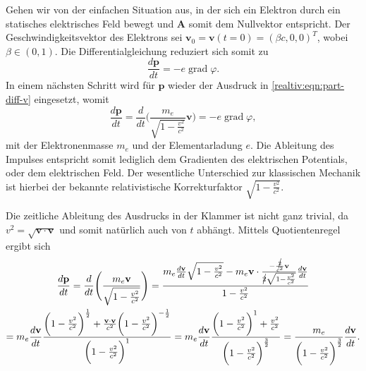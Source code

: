 \begin{beispiel}
\label{realtiv:bsp:teilchen-konst-e-feld}
Gehen wir von der einfachen Situation aus,
in der sich ein Elektron durch ein statisches
elektrisches Feld bewegt und \(\mathbf{A}\)
somit dem Nullvektor entspricht.
Der Geschwindigkeitsvektor des Elektrons sei
\(\mathbf{v}_0 = \mathbf{v}(t=0) =(\beta c, 0, 0)^T\), wobei
\(\beta \in (0, 1)\).
Die Differentialgleichung reduziert sich somit zu
\begin{equation}
    \frac{d\mathbf{p}}{dt} =
    - e \operatorname{grad} \varphi.
    \label{relativ:eqn:euler-lagrange-bsp-1}
\end{equation}
In einem nächsten Schritt wird für \(\mathbf{p}\)
wieder der Ausdruck in \eqref{realtiv:eqn:part-diff-v} eingesetzt,
womit
\begin{equation}
    \frac{d\mathbf{p}}{dt} =
    \frac{d}{dt} \Biggl(\frac{m_e}{\sqrt{1-\frac{v^2}{c^2}}} \mathbf{v}\Biggr) =
    - e \operatorname{grad} \varphi,
\end{equation}
mit der Elektronenmasse \(m_e\) und der Elementarladung \(e\).
Die Ableitung des Impulses entspricht somit lediglich
dem Gradienten des elektrischen Potentials, oder dem elektrischen Feld.
Der wesentliche Unterschied zur klassischen Mechanik ist hierbei
der bekannte relativistische Korrekturfaktor
\(\sqrt{1-\frac{v^2}{c^2}}\).

Die zeitliche Ableitung des Ausdrucks in der Klammer ist nicht ganz trivial,
da \(v^2=\sqrt{\mathbf{v}\cdot\mathbf{v}}\)
und somit natürlich auch von \(t\) abhängt.
Mittels Quotientenregel ergibt sich
\begin{multline*}
    \frac{d\mathbf{p}}{dt}
    = \frac{d}{dt} \Biggl(\frac{m_e \mathbf{v}}{\sqrt{1-\frac{v^2}{c^2}}}\Biggr)
    = \frac{m_e\frac{d\mathbf{v}}{dt}\sqrt{1-\frac{v^2}{c^2}}
    -m_e\mathbf{v}\cdot\frac{-\frac{\cancel{2}}{c^2}\mathbf{v}}{\cancel{2}\sqrt{1-\frac{v^2}{c^2}}}
    \frac{d\mathbf{v}}{dt}}{1-\frac{v^2}{c^2}}\\
    = m_e\frac{d\mathbf{v}}{dt}\frac{\biggl(1-\frac{v^2}{c^2}\biggr)^\frac{1}{2}
    +\frac{\mathbf{v}\cdot\mathbf{v}}{c^2} \biggl(1-\frac{v^2}{c^2}\biggr)^{-\frac{1}{2}}}
    {\biggl(1-\frac{v^2}{c^2}\biggr)^1}
    = m_e\frac{d\mathbf{v}}{dt}\frac{\biggl(1-\frac{v^2}{c^2}\biggr)^1
    +\frac{v^2}{c^2}}{\biggl(1-\frac{v^2}{c^2}\biggr)^\frac{3}{2}}
    = \frac{m_e}{\biggl(1-\frac{v^2}{c^2}\biggr)^\frac{3}{2}}\frac{d\mathbf{v}}{dt}.
\end{multline*}


\end{beispiel}
